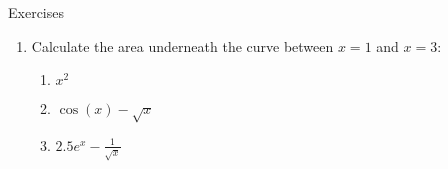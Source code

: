 \documentclass[../revisedmain.tex]{subfiles}
\begin{document}
	\begin{center}
		\LARGE Exercises
	\end{center}
	\begin{enumerate}
		\item Calculate the area underneath the curve between $x=1$ and $x=3$:
		\begin{enumerate}
			\item $x^2$
			\item $\cos(x)-\sqrt{x}$
			\item $2.5e^x-\frac{1}{\sqrt{x}}$
		\end{enumerate}
	\end{enumerate}
\end{document}
